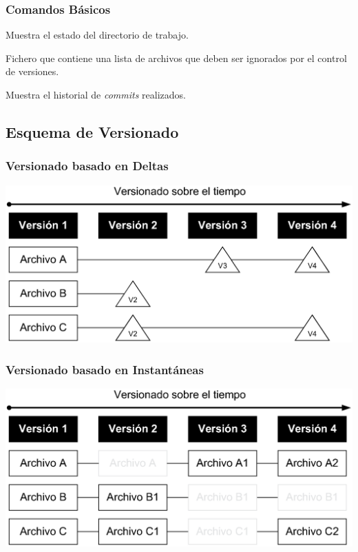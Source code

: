 \documentclass[handout,a4paper,slidestop,dvips,xcolor=pst,blue]{beamer}
\begin{document}
\begin{frame}[c]
	\frametitle{Comandos Básicos}
	 \begin{description}[<+->]
        \item[status] Muestra el estado del directorio de trabajo.
        \item[.gitignore] Fichero que contiene una lista de archivos que deben ser ignorados por el control de versiones.
        \item[log] Muestra el historial de \emph{commits} realizados.
	 \end{description}
\end{frame}

\subsection{Esquema de Versionado}

\begin{frame}[c]
	\frametitle{Versionado basado en Deltas}
	 \begin{center}
		\includegraphics[width=\linewidth,keepaspectratio=true]{images/git/deltas.eps}
	 \end{center}
\end{frame}

\begin{frame}[c]
	\frametitle{Versionado basado en Instantáneas}
	 \begin{center}
		\includegraphics[width=\linewidth,keepaspectratio=true]{images/git/snapshots.eps}
	 \end{center}
\end{frame}
\end{document}
